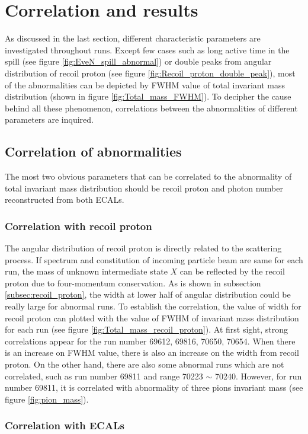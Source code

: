 
\section{Correlation and results}
As discussed in the last section, different characteristic parameters are investigated throughout runs. Except few cases such as long active time in the spill (see figure \ref{fig:EveN_spill_abnormal}) or double peaks from angular distribution of recoil proton (see figure \ref{fig:Recoil_proton_double_peak}), most of the abnormalities can be depicted by FWHM value of total invariant mass distribution (shown in figure \ref{fig:Total_mass_FWHM}). To decipher the cause behind all these phenomenon, correlations between the abnormalities of different parameters are inquired.

\subsection{Correlation of abnormalities}
The most two obvious parameters that can be correlated to the abnormality of total invariant mass distribution should be recoil proton and photon number reconstructed from both ECALs.
\subsubsection{Correlation with recoil proton}
The angular distribution of recoil proton is directly related to the scattering process. If spectrum and constitution of incoming particle beam are same for each run, the mass of unknown intermediate state $X$ can be reflected by the recoil proton due to four-momentum conservation. As is shown in subsection \ref{subsec:recoil_proton}, the width at lower half of angular distribution could be really large for abnormal runs. To establish the correlation, the value of width for recoil proton can plotted with the value of FWHM of invariant mass distribution for each run (see figure \ref{fig:Total_mass_recoil_proton}). At first sight, strong correlations appear for the run number 69612, 69816, 70650, 70654. When there is an increase on FWHM value, there is also an increase on the width from recoil proton. On the other hand, there are also some abnormal runs which are not correlated, such as run number 69811 and range 70223 $\sim$ 70240. However, for run number 69811, it is correlated with abnormality of three pions invariant mass (see figure \ref{fig:pion_mass}).


\subsubsection{Correlation with ECALs}

